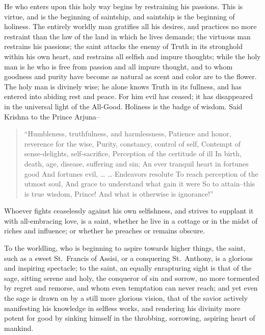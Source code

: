 \documentclass[12pt,oneside]{scrbook}
\begin{document}
  He who enters upon this holy way begins by restraining his passions.
  This is virtue, and is the beginning of saintship, and saintship is the
  beginning of holiness. The entirely worldly man gratifies all his
  desires, and practices no more restraint than the law of the land in
  which he lives demands; the virtuous man restrains his passions; the
  saint attacks the enemy of Truth in its stronghold within his own heart,
  and restrains all selfish and impure thoughts; while the holy man is he
  who is free from passion and all impure thought, and to whom goodness
  and purity have become as natural as scent and color are to the flower.
  The holy man is divinely wise; he alone knows Truth in its fullness, and
  has entered into abiding rest and peace. For him evil has ceased; it has
  disappeared in the universal light of the All-Good. Holiness is the
  badge of wisdom. Said Krishna to the Prince Arjuna--
  
  \begin{quote}
  ``Humbleness, truthfulness, and harmlessness, Patience and honor,
  reverence for the wise, Purity, constancy, control of self, Contempt of
  sense-delights, self-sacrifice, Perception of the certitude of ill In
  birth, death, age, disease, suffering and sin; An ever tranquil heart in
  fortunes good And fortunes evil, \ldots{} \ldots{} Endeavors resolute To
  reach perception of the utmost soul, And grace to understand what gain
  it were So to attain--this is true wisdom, Prince! And what is otherwise
  is ignorance!''
  \end{quote}
  
  Whoever fights ceaselessly against his own selfishness, and strives to
  supplant it with all-embracing love, is a saint, whether he live in a
  cottage or in the midst of riches and influence; or whether he preaches
  or remains obscure.
  
  To the worldling, who is beginning to aspire towards higher things, the
  saint, such as a sweet St.~Francis of Assisi, or a conquering
  St.~Anthony, is a glorious and inspiring spectacle; to the saint, an
  equally enrapturing sight is that of the sage, sitting serene and holy,
  the conqueror of sin and sorrow, no more tormented by regret and
  remorse, and whom even temptation can never reach; and yet even the sage
  is drawn on by a still more glorious vision, that of the savior actively
  manifesting his knowledge in selfless works, and rendering his divinity
  more potent for good by sinking himself in the throbbing, sorrowing,
  aspiring heart of mankind.
  
\end{document}
